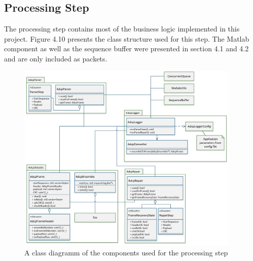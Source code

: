 \subsection{Processing Step}
The processing step contains most of the business logic implemented in this project. Figure 4.10 presents the class structure used for this step. The Matlab component as well as the sequence buffer were presented in section 4.1 and 4.2 and are only included as packets.

\begin{figure}[h]
\centering
      \includegraphics[width=0.95\textwidth]{logger_class}
        \caption{A class diagramm of the components used for the processing step}
\end{figure}

